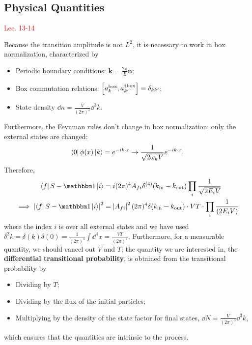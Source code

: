 \documentclass{article}
\begin{document}
\subsection{Physical Quantities}
\textcolor{red}{Lec. 13-14}

Because the transition amplitude is not $L^2$, it is necessary to work in box normalization, characterized by
\begin{itemize}
    \item Periodic boundary conditions: $\mathbf k=\frac{2\pi}L\mathbf n$;
    \item Box commutation relations: $\comm{a^\text{box}_k}{a^{\dag\text{box}}_{k'}}=\delta_{kk'}$;
    \item State density $\dd n=\frac V{(2\pi)^3}\dd^3k$.
\end{itemize}
Furthermore, the Feynman rules don't change in box normalization; only the external states are changed:
$$\bra 0\phi(x)\ket k=e^{-ik\cdot x}\to \frac 1{\sqrt{2\omega_kV}}e^{-ik\cdot x}.$$
Therefore, 
\begin{align*}
    \bra fS-\mathbbm 1\ket i&=i(2\pi)^4A_{fi}\delta^{(4)}(k_\text{in}-k_\text{out})\prod_i\frac 1{\sqrt{2E_iV}}\\
    \implies \abs{\bra fS-\mathbbm 1\ket i}^2&=\abs{A_{fi}}^2(2\pi)^4\delta(k_\text{in}-k_\text{out})\cdot VT\cdot\prod_i\frac 1{(2E_iV)}
\end{align*}
where the index $i$ is over all external states and we have used $\delta^2k=\delta(k)\delta(0)=\frac 1{(2\pi)^4}\int \dd^4x=\frac{VT}{(2\pi)^4}$. Furthermore, for a measurable quantity, we should cancel out $V$ and $T$; the quantity we are interested in, the \textbf{differential transitional probability}, is obtained from the transitional probability by
\begin{itemize}
    \item Dividing by $T$; 
    \item Dividing by the flux of the initial particles;
    \item Multiplying by the density of the state factor for final states, $\dd N=\frac V{(2\pi)^3}\dd^3k$,
\end{itemize}
which ensures that the quantities are intrinsic to the process.
\end{document}
